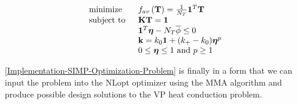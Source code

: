 \begin{equation}
	\begin{tabular}{ll}
		$\text{minimize}$  & $f_{av}\left({\mathbf{T}}\right)=\frac{1}{N_T}\mathbf{1}^T\mathbf{T}$                                                                                     \\
		\text{subject to } & $\mathbf{K}\mathbf{T}=\mathbf{1}$                                                                   \\
		& $\mathbf{1}^T\boldsymbol{\eta}-N_T\overline{\phi}\leq0$ \\
		& $\mathbf{k}=k_0\mathbf{1}+(k_+-k_0)\boldsymbol{\eta}^p$                                       \\
		& $0\leq\boldsymbol{\eta}\leq 1\text{ and } p\geq 1$
	\end{tabular}\label{Implementation-SIMP-Optimization-Problem}
\end{equation}

\eqref{Implementation-SIMP-Optimization-Problem} is finally in a form that we can input the problem into the NLopt optimizer using the MMA algorithm and produce possible design solutions to the VP heat conduction problem.